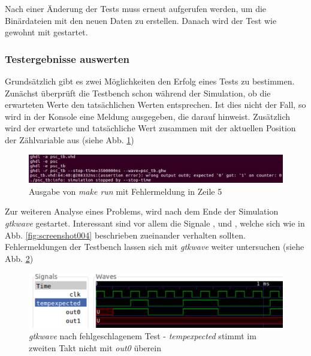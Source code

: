 \documentclass[a4paper]{article}
\begin{document}
			   \noindent Nach einer Änderung der Tests muss  erneut aufgerufen werden,
			    um die Binärdateien mit den neuen Daten zu erstellen. Danach wird der Test wie gewohnt mit  gestartet.
   			
   		\subsubsection{Testergebnisse auswerten}

			   Grundsätzlich gibt es zwei Möglichkeiten den Erfolg eines Tests zu bestimmen. Zunächst überprüft die Testbench schon während der Simulation, 
			   ob die erwarteten Werte den tatsächlichen Werten entsprechen. Ist dies nicht der Fall, so wird in der Konsole eine Meldung ausgegeben, 
			   die darauf hinweist. Zusätzlich wird der erwartete und tatsächliche Wert zusammen mit der aktuellen Position der Zählvariable aus (siehe Abb. \ref{fig:screenshot002})
   			
   			\begin{figure}[hb]
   				\centering
   				\includegraphics[width=0.7\linewidth]{images/screenshot002}
   				\caption{Ausgabe von \emph{make run} mit Fehlermeldung in Zeile 5}
   				\label{fig:screenshot002}
   			\end{figure}
   			
			   Zur weiteren Analyse eines Problems, wird nach dem Ende der Simulation \emph{gtkwave} gestartet. 
			   Interessant sind vor allem die Signale ,  und , welche sich wie in Abb. \ref{fig:screenshot004} 
			   beschrieben zueinander verhalten sollten. Fehlermeldungen der Testbench lassen sich mit \emph{gtkwave} weiter untersuchen (siehe Abb. \ref{fig:screenshot003})
   			
   			\begin{figure}[hb]
   				\centering
   				\includegraphics[width=0.7\linewidth]{images/screenshot003}
   				\caption{\emph{gtkwave} nach fehlgeschlagenem Test - \emph{tempexpected} stimmt im zweiten Takt nicht mit \emph{out0} überein}
   				\label{fig:screenshot003}
   			\end{figure}
   			
\end{document}
